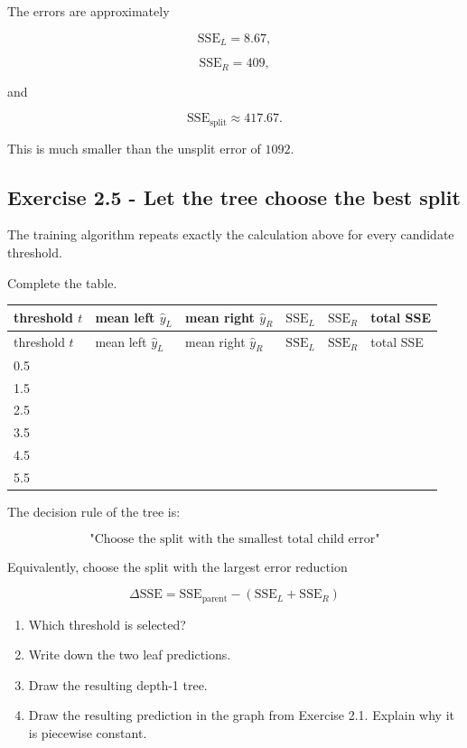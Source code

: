 \documentclass[10pt]{article}
\begin{document}
The errors are approximately

\[
\mathrm{SSE}_L=8.67,
\]

\[
\mathrm{SSE}_R=409,
\]

and

\[
\mathrm{SSE}_{\mathrm{split}}\approx417.67.
\]

This is much smaller than the unsplit error of $1092$.

\par\endgroup

\subsection*{Exercise 2.5 - Let the tree choose the best split}
The training algorithm repeats exactly the calculation above for every candidate threshold.

Complete the table.

\begingroup
\small
\setlength{\tabcolsep}{4pt}
\begin{longtable}{l|l|l|l|l|l}
threshold $t$ & mean left $\hat y_L$ & mean right $\hat y_R$ & $\mathrm{SSE}_L$ & $\mathrm{SSE}_R$ & total SSE \\
\hline
\endfirsthead
threshold $t$ & mean left $\hat y_L$ & mean right $\hat y_R$ & $\mathrm{SSE}_L$ & $\mathrm{SSE}_R$ & total SSE \\
\hline
\endhead
0.5 &  &  &  &  &  \\[3pt]
1.5 &  &  &  &  &  \\[3pt]
2.5 &  &  &  &  &  \\[3pt]
3.5 &  &  &  &  &  \\[3pt]
4.5 &  &  &  &  &  \\[3pt]
5.5 &  &  &  &  &  \\[3pt]
\end{longtable}
\endgroup
The decision rule of the tree is:

\[
\text{"Choose the split with the smallest total child error"}
\]

Equivalently, choose the split with the largest error reduction

\[
\Delta \mathrm{SSE}
=
\mathrm{SSE}_{\mathrm{parent}}
-
\left(
\mathrm{SSE}_L+\mathrm{SSE}_R
\right)
\]

\begin{enumerate}
\item
Which threshold is selected?

\item
Write down the two leaf predictions.

\item
Draw the resulting depth-1 tree.

\item
Draw the resulting prediction in the graph from Exercise 2.1. Explain why it is piecewise constant.

\end{enumerate}
\begingroup\color{red}
\end{document}
